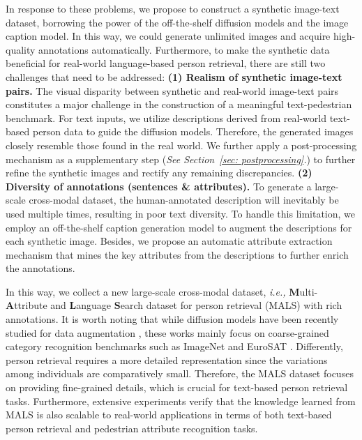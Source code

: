 \documentclass[sigconf]{acmart}
\begin{document}
In response to these problems, we propose to construct a synthetic image-text dataset, borrowing the power of the off-the-shelf diffusion models and the image caption model. 
In this way, we could generate unlimited images and acquire high-quality annotations automatically.
Furthermore, to make the synthetic data beneficial for real-world language-based person retrieval, there are still two challenges that need to be addressed: 
\textbf{(1) Realism of synthetic image-text pairs.} 
The visual disparity between synthetic and real-world image-text pairs constitutes a major challenge in the construction of a meaningful text-pedestrian benchmark.
For text inputs, we utilize descriptions derived from real-world text-based person data to guide the diffusion models. 
Therefore, the generated images closely resemble those found in the real world.
We further apply a post-processing mechanism as a supplementary step (\emph{See Section~\ref{sec: postprocessing}.}) to further refine the synthetic images and rectify any remaining discrepancies.
\textbf{(2) Diversity of annotations (sentences \& attributes).} 
To generate a large-scale cross-modal dataset, the human-annotated description will inevitably be used multiple times, resulting in poor text diversity. 
To handle this limitation, we employ an off-the-shelf caption generation model to augment the descriptions for each synthetic image. 
Besides, we propose an automatic attribute extraction mechanism that mines the key attributes from the descriptions to further enrich the annotations.


In this way, we collect a new large-scale cross-modal dataset, \emph{i.e., } \textbf{M}ulti-\textbf{A}ttribute and \textbf{L}anguage \textbf{S}earch dataset for person retrieval (MALS) with rich annotations. 
It is worth noting that while diffusion models have been recently studied for data augmentation \cite{azizi2023synthetic, shiparddiversity, sariyildiz2023fake}, 
these works mainly focus on coarse-grained category recognition benchmarks such as ImageNet \cite{5206848} and EuroSAT \cite{helber2019eurosat}.
Differently, person retrieval requires a more detailed representation since the variations among individuals are comparatively small. 
Therefore, the MALS dataset focuses on providing fine-grained details, which is crucial for text-based person retrieval tasks. 
Furthermore, extensive experiments verify that the knowledge learned from MALS is also scalable to real-world applications in terms of both text-based person retrieval and pedestrian attribute recognition tasks.
\end{document}
